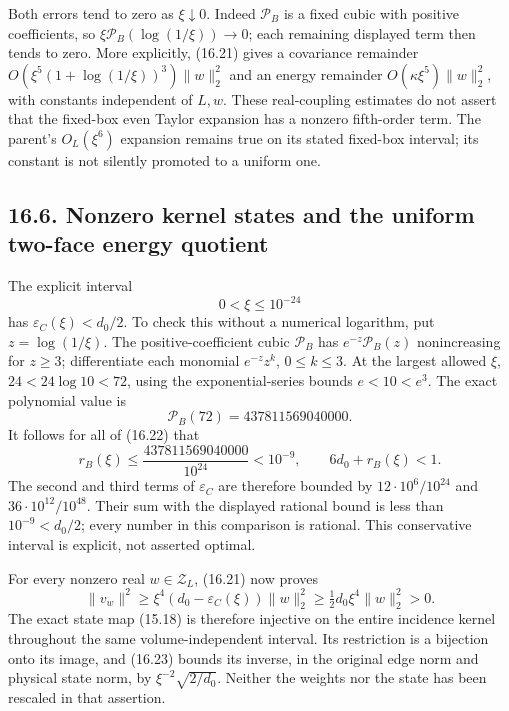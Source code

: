 \documentclass[
]{article}
\begin{document}
Both errors tend to zero as \(\xi\downarrow0\). Indeed \(\mathcal P_B\)
is a fixed cubic with positive coefficients, so
\(\xi\mathcal P_B(\log(1/\xi))\to0\); each remaining displayed term then
tends to zero. More explicitly, (16.21) gives a covariance remainder
\(O(\xi^5(1+\log(1/\xi))^3)\|w\|_2^2\) and an energy remainder
\(O(\kappa\xi^5)\|w\|_2^2\), with constants independent of \(L,w\).
These real-coupling estimates do not assert that the fixed-box even
Taylor expansion has a nonzero fifth-order term. The parent's
\(O_L(\xi^6)\) expansion remains true on its stated fixed-box interval;
its constant is not silently promoted to a uniform one.

\subsection{16.6. Nonzero kernel states and the uniform two-face energy
quotient}\label{nonzero-kernel-states-and-the-uniform-two-face-energy-quotient}

The explicit interval \[
0<\xi\le10^{-24}                                             \tag{16.22}
\] has \(\varepsilon_C(\xi)<d_0/2\). To check this without a numerical
logarithm, put \(z=\log(1/\xi)\). The positive-coefficient cubic
\(\mathcal P_B\) has \(e^{-z}\mathcal P_B(z)\) nonincreasing for
\(z\ge3\); differentiate each monomial \(e^{-z}z^k\), \(0\le k\le3\). At
the largest allowed \(\xi\), \(24<24\log10<72\), using the
exponential-series bounds \(e<10<e^3\). The exact polynomial value is \[
\mathcal P_B(72)=437811569040000 .
\] It follows for all of (16.22) that \[
r_B(\xi)\le
\frac{437811569040000}{10^{24}}<10^{-9},\qquad
6d_0+r_B(\xi)<1.
\] The second and third terms of \(\varepsilon_C\) are therefore bounded
by \(12\cdot10^6/10^{24}\) and \(36\cdot10^{12}/10^{48}\). Their sum
with the displayed rational bound is less than \(10^{-9}<d_0/2\); every
number in this comparison is rational. This conservative interval is
explicit, not asserted optimal.

For every nonzero real \(w\in\mathscr Z_L\), (16.21) now proves \[
\|v_w\|^2\ge\xi^4(d_0-\varepsilon_C(\xi))\|w\|_2^2
 \ge\tfrac12d_0\xi^4\|w\|_2^2>0.                             \tag{16.23}
\] The exact state map (15.18) is therefore injective on the entire
incidence kernel throughout the same volume-independent interval. Its
restriction is a bijection onto its image, and (16.23) bounds its
inverse, in the original edge norm and physical state norm, by
\(\xi^{-2}\sqrt{2/d_0}\). Neither the weights nor the state has been
rescaled in that assertion.
\end{document}
